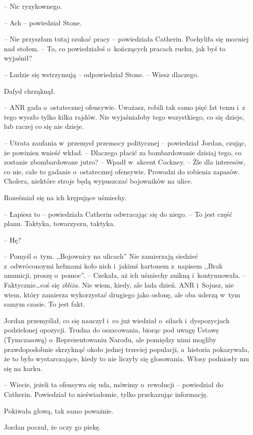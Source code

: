\documentclass[oneside,polish,11pt,sfheadings]{mwbk}
\begin{document}
-- Nic ryzykownego.

-- Ach -- powiedział Stone.

-- Nie przyszłam tutaj szukać pracy -- powiedziała Catherin. Pochyliła się
mocniej nad stołem. -- To, co powiedziałeś o~kończących pracach ruchu,
jak byś to wyjaśnił?

-- Ludzie się wstrzymują -- odpowiedział Stone. -- Wiesz dlaczego.

Dafyd chrząknął. 

-- ANR gada o~ostatecznej ofensywie. Uważasz, robili tak
samo pięć lat temu i~z tego wyszło tylko kilka rajdów. Nie wyjaśniałoby
tego wszystkiego, co się dzieje, lub raczej co się nie dzieje.

-- Utrata zaufania w~przemysł przemocy politycznej -- powiedział Jordan,
czując, że powinien wnieść wkład. -- Dlaczego płacić za bombardowanie
dzisiaj tego, co zostanie zbombardowane jutro? -- Wpadł w~akcent Cockney.
-- Źle dla interesów, co nie, całe to gadanie o~ostatecznej ofensywie.
Prowadzi do robienia zapasów. Cholera, niektóre stroje będą wypuszczać
bojowników na ulice.

Roześmiał się na ich krępujące uśmiechy.

-- Łapiesz to -- powiedziała Catherin odwracając się do niego. -- To jest
część planu. Taktyka, towarzyszu, taktyka.

-- Hę?

-- Pomyśl o~tym. ,,Bojownicy na ulicach'' Nie zamierzają siedzieć z~odwróconoymi hełmami koło nich i~jakimś kartonem z~napisem ,,Brak
amunicji, proszę o~pomoc''. -- Czekała, aż ich uśmiechy znikną i~kontynuowała. -- Faktycznie\ldots coś się \emph{zbliża.} Nie wiem, kiedy,
ale lada dzień. ANR i~Sojusz, nie wiem, który zamierza wykorzystać
drugiego jako osłonę, ale oba uderzą w~tym samym czasie. To jest fakt.

Jordan przemyślał, co się nauczył i~co już wiedział o~siłach i~dyspozycjach podzielonej opozycji. Trudna do oszacowania, biorąc pod
uwagę Ustawę (Tymczasową) o~Reprezentowaniu Narodu, ale pomiędzy nimi
mogliby prawdopodobnie skrzyknąć około jednej trzeciej populacji, a~historia pokazywała, że to było wystarczające, kiedy to nie liczyły się
głosowania. Włosy podniosły mu się na karku.

-- Wiecie, jeżeli ta ofensywa się uda, mówimy o~rewolucji -- powiedział do
Catherin. Powiedział to nieświadomie, tylko przekazując informację.

Pokiwała głową, tak samo poważnie.

Jordan poczuł, że oczy go piekę.
\end{document}
